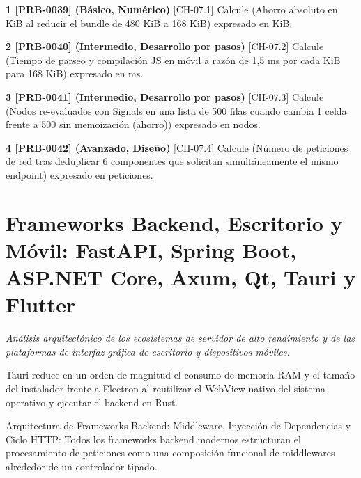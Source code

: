 \documentclass{book}
\begin{document}
\begin{tcolorbox}[title={Ejercicios}, studiumworked, breakable]

\noindent\textbf{1 [PRB-0039] (Básico, Numérico)}
[CH-07.1] Calcule (Ahorro absoluto en KiB al reducir el bundle de 480 KiB a 168 KiB) expresado en KiB.

\noindent\textbf{2 [PRB-0040] (Intermedio, Desarrollo por pasos)}
[CH-07.2] Calcule (Tiempo de parseo y compilación JS en móvil a razón de 1,5 ms por cada KiB para 168 KiB) expresado en ms.

\noindent\textbf{3 [PRB-0041] (Intermedio, Desarrollo por pasos)}
[CH-07.3] Calcule (Nodos re-evaluados con Signals en una lista de 500 filas cuando cambia 1 celda frente a 500 sin memoización (ahorro)) expresado en nodos.

\noindent\textbf{4 [PRB-0042] (Avanzado, Diseño)}
[CH-07.4] Calcule (Número de peticiones de red tras deduplicar 6 componentes que solicitan simultáneamente el mismo endpoint) expresado en peticiones.
\end{tcolorbox}

\chapter{Frameworks Backend, Escritorio y Móvil: FastAPI, Spring Boot, ASP.NET Core, Axum, Qt, Tauri y Flutter}
\label{chap:ch-08}

\noindent\textit{Análisis arquitectónico de los ecosistemas de servidor de alto rendimiento y de las plataformas de interfaz gráfica de escritorio y dispositivos móviles.}

\begin{tcolorbox}[title={Consejo}, studiumtip, breakable]

Tauri reduce en un orden de magnitud el consumo de memoria RAM y el tamaño del instalador frente a Electron al reutilizar el WebView nativo del sistema operativo y ejecutar el backend en Rust.
\end{tcolorbox}

\begin{tcolorbox}[title={Definición}, studiumdef, breakable]

Arquitectura de Frameworks Backend: Middleware, Inyección de Dependencias y Ciclo HTTP: Todos los frameworks backend modernos estructuran el procesamiento de peticiones como una composición funcional de middlewares alrededor de un controlador tipado.
\end{tcolorbox}
\end{document}
